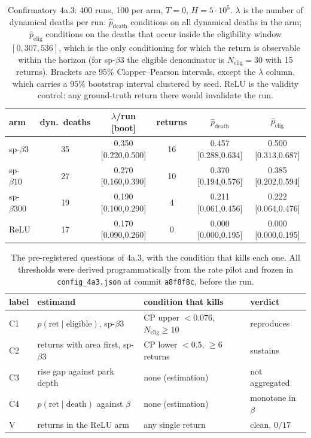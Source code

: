 \documentclass[11pt]{article}
\theoremstyle{definition}
\theoremstyle{remark}
\begin{document}
\begin{table}[t]
\centering
\caption{Confirmatory 4a.3: 400 runs, 100 per arm, $T=0$, $H=5\cdot10^{5}$.
$\lambda$ is the number of dynamical deaths per run.
$\hat p_{\mathrm{death}}$ conditions on all dynamical deaths in the arm;
$\hat p_{\mathrm{elig}}$ conditions on the deaths that occur inside the
eligibility window $[0,307{,}536]$, which is the only conditioning for which the
return is observable within the horizon (for sp-$\beta3$ the eligible denominator
is $N_{\mathrm{elig}}=30$ with 15 returns). Brackets are $95\%$ Clopper--Pearson
intervals, except the $\lambda$ column, which carries a $95\%$ bootstrap interval
clustered by seed. ReLU is the validity control: any ground-truth return there
would invalidate the run.}
\label{tab:4a3}
\small
\begin{tabular}{lccccc}
\toprule
arm & dyn.\ deaths & $\lambda$/run [boot] & returns & $\hat p_{\mathrm{death}}$ & $\hat p_{\mathrm{elig}}$ \\
\midrule
sp-$\beta3$   & 35 & 0.350 [0.220,0.500] & 16 & 0.457 [0.288,0.634] & 0.500 [0.313,0.687] \\
sp-$\beta10$  & 27 & 0.270 [0.160,0.390] & 10 & 0.370 [0.194,0.576] & 0.385 [0.202,0.594] \\
sp-$\beta300$ & 19 & 0.190 [0.100,0.290] & 4  & 0.211 [0.061,0.456] & 0.222 [0.064,0.476] \\
ReLU          & 17 & 0.170 [0.090,0.260] & 0  & 0.000 [0.000,0.195] & 0.000 [0.000,0.195] \\
\bottomrule
\end{tabular}
\end{table}

\begin{table}[t]
\centering
\caption{The pre-registered questions of 4a.3, with the condition that kills each
one. All thresholds were derived programmatically from the rate pilot and frozen
in \texttt{config\_4a3.json} at commit \texttt{a8f8f8c}, before the run.}
\label{tab:preregistered}
\small
\begin{tabular}{@{}llll@{}}
\toprule
label & estimand & condition that kills & verdict \\
\midrule
C1 & $p(\mathrm{ret}\mid\mathrm{eligible})$, sp-$\beta3$
   & CP upper $<0.076$, $N_{\mathrm{elig}}\ge10$ & reproduces \\
C2 & returns with area first, sp-$\beta3$
   & CP lower $<0.5$, $\ge6$ returns & sustains \\
C3 & rise gap against park depth
   & none (estimation) & not aggregated \\
C4 & $p(\mathrm{ret}\mid\mathrm{death})$ against $\beta$
   & none (estimation) & monotone in $\beta$ \\
V  & returns in the ReLU arm
   & any single return & clean, $0/17$ \\
\bottomrule
\end{tabular}
\end{table}
\end{document}
